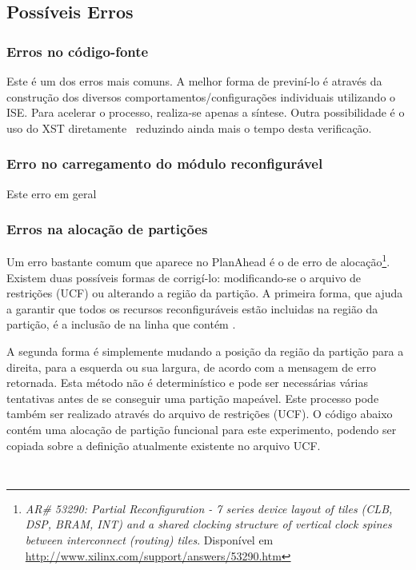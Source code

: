 \documentclass[11pt,a4paper,oneside]{book}
\begin{document}
\subsection{Possíveis Erros}
\subsubsection{Erros no código-fonte} Este é um dos erros mais comuns.
A melhor forma de previní-lo é através da construção dos diversos comportamentos/configurações individuais utilizando o ISE.
Para acelerar o processo, realiza-se apenas a síntese.
Outra possibilidade é o uso do XST diretamente \, reduzindo ainda mais o tempo desta verificação. 

\subsubsection{Erro no carregamento do módulo reconfigurável}
Este erro em geral

\subsubsection{Erros na alocação de partições}
\label{par:alocacao}
Um erro bastante comum que aparece no PlanAhead é o de erro de alocação\footnote{\textit{AR\# 53290: Partial Reconfiguration - 7 series device layout of tiles (CLB, DSP, BRAM, INT) and a shared clocking structure of vertical clock spines between interconnect (routing) tiles}. Disponível em \url{http://www.xilinx.com/support/answers/53290.htm}}.
Existem duas possíveis formas de corrigí-lo: modificando-se o arquivo de restrições (UCF) ou alterando a região da partição.
A primeira forma, que ajuda a garantir que todos os recursos reconfiguráveis estão incluidas na região da partição, é a inclusão de  na linha que contém .

A segunda forma é simplemente mudando a posição da região da partição para a direita, para a esquerda ou sua largura, de acordo com a mensagem de erro retornada.
Esta método não é determinístico e pode ser necessárias várias tentativas antes de se conseguir uma partição mapeável. 
Este processo pode também ser realizado através do arquivo de restrições (UCF).
O código abaixo contém uma alocação de partição funcional para este experimento, podendo ser copiada sobre a definição atualmente existente no arquivo UCF.
\begin{lstlisting}
				
\end{lstlisting}
\end{document}
